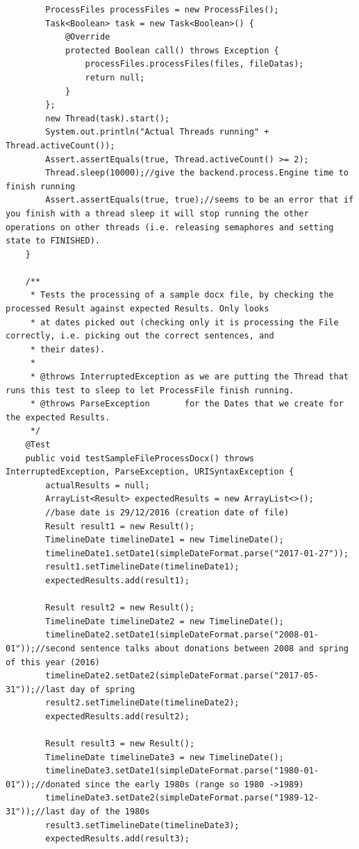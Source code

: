 \begin{lstlisting}
        ProcessFiles processFiles = new ProcessFiles();
        Task<Boolean> task = new Task<Boolean>() {
            @Override
            protected Boolean call() throws Exception {
                processFiles.processFiles(files, fileDatas);
                return null;
            }
        };
        new Thread(task).start();
        System.out.println("Actual Threads running" + Thread.activeCount());
        Assert.assertEquals(true, Thread.activeCount() >= 2);
        Thread.sleep(10000);//give the backend.process.Engine time to finish running
        Assert.assertEquals(true, true);//seems to be an error that if you finish with a thread sleep it will stop running the other operations on other threads (i.e. releasing semaphores and setting state to FINISHED).
    }

    /**
     * Tests the processing of a sample docx file, by checking the processed Result against expected Results. Only looks
     * at dates picked out (checking only it is processing the File correctly, i.e. picking out the correct sentences, and
     * their dates).
     *
     * @throws InterruptedException as we are putting the Thread that runs this test to sleep to let ProcessFile finish running.
     * @throws ParseException       for the Dates that we create for the expected Results.
     */
    @Test
    public void testSampleFileProcessDocx() throws InterruptedException, ParseException, URISyntaxException {
        actualResults = null;
        ArrayList<Result> expectedResults = new ArrayList<>();
        //base date is 29/12/2016 (creation date of file)
        Result result1 = new Result();
        TimelineDate timelineDate1 = new TimelineDate();
        timelineDate1.setDate1(simpleDateFormat.parse("2017-01-27"));
        result1.setTimelineDate(timelineDate1);
        expectedResults.add(result1);

        Result result2 = new Result();
        TimelineDate timelineDate2 = new TimelineDate();
        timelineDate2.setDate1(simpleDateFormat.parse("2008-01-01"));//second sentence talks about donations between 2008 and spring of this year (2016)
        timelineDate2.setDate2(simpleDateFormat.parse("2017-05-31"));//last day of spring
        result2.setTimelineDate(timelineDate2);
        expectedResults.add(result2);

        Result result3 = new Result();
        TimelineDate timelineDate3 = new TimelineDate();
        timelineDate3.setDate1(simpleDateFormat.parse("1980-01-01"));//donated since the early 1980s (range so 1980 ->1989)
        timelineDate3.setDate2(simpleDateFormat.parse("1989-12-31"));//last day of the 1980s
        result3.setTimelineDate(timelineDate3);
        expectedResults.add(result3);


\end{lstlisting}
